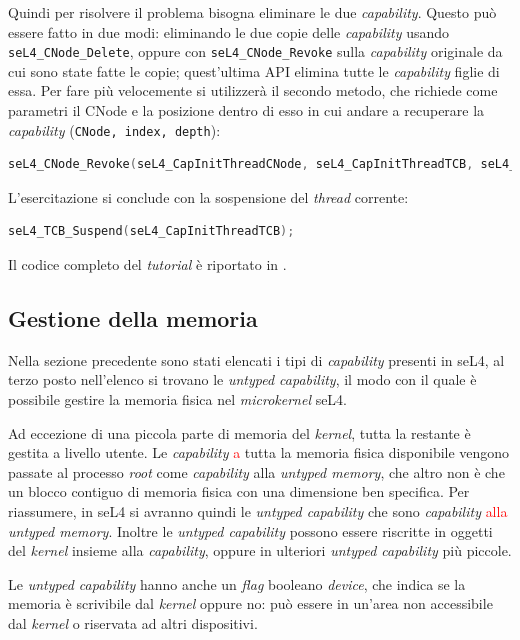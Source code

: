 Quindi per risolvere il problema bisogna eliminare le due \textit{capability}. Questo può essere fatto in due modi: eliminando le due copie delle \textit{capability} usando \texttt{seL4\_CNode\_Delete}, oppure con \texttt{seL4\_CNode\_Revoke} sulla \textit{capability} originale da cui sono state fatte le copie; quest'ultima API elimina tutte le \textit{capability} figlie di essa. Per fare più velocemente si utilizzerà il secondo metodo, che richiede come parametri il CNode e la posizione dentro di esso in cui andare a recuperare la \textit{capability} (\texttt{CNode, index, depth}):
\begin{lstlisting}[language=C++]
seL4_CNode_Revoke(seL4_CapInitThreadCNode, seL4_CapInitThreadTCB, seL4_WordBits);
\end{lstlisting}

L'esercitazione si conclude con la sospensione del \textit{thread} corrente:
\begin{lstlisting}[language=C++]
seL4_TCB_Suspend(seL4_CapInitThreadTCB);
\end{lstlisting}
Il codice completo del \textit{tutorial} è riportato in \cite{capability}.

\subsection{Gestione della memoria}
Nella sezione precedente sono stati elencati i tipi di \textit{capability} presenti in seL4, al terzo posto nell'elenco si trovano le \textit{untyped capability}, il modo con il quale è possibile gestire la memoria fisica nel \textit{microkernel} seL4.

Ad eccezione di una piccola parte di memoria del \textit{kernel}, tutta la restante è gestita a livello utente. Le \textit{capability} \textcolor{red}{a} tutta la memoria fisica disponibile vengono passate al processo \textit{root} come \textit{capability} alla \textit{untyped memory}, che altro non è che un blocco contiguo di memoria fisica con una dimensione ben specifica. Per riassumere, in seL4 si avranno quindi le \textit{untyped capability} che sono \textit{capability} \textcolor{red}{alla} \textit{untyped memory}. Inoltre le \textit{untyped capability} possono essere riscritte in oggetti del \textit{kernel} insieme alla \textit{capability}, oppure in ulteriori \textit{untyped capability} più piccole.

Le \textit{untyped capability} hanno anche un \textit{flag} booleano \textit{device}, che indica se la memoria è scrivibile dal \textit{kernel} oppure no: può essere in un'area non accessibile dal \textit{kernel} o riservata ad altri dispositivi.

